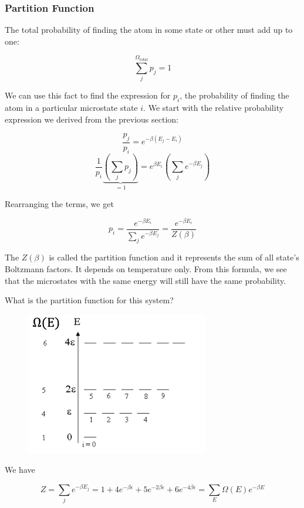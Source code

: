 \subsubsection{Partition Function}

The total probability of finding the atom in some state or other must add up to one:

$$\sum_j^{\Omega_{total}}p_j=1$$

We can use this fact to find the expression for $p_i$, the probability of finding the atom in a particular microstate state $i$. We start with the relative probability expression we derived from the previous section:

$$\frac{p_j}{p_i}=e^{-\beta(E_j-E_i)}$$
$$\frac{1}{p_i} \underbrace{\left( \sum_j p_j \right)}_{=1} = e^{\beta E_i}\left( \sum_j e^{-\beta E_j} \right)$$

Rearranging the terms, we get

$$\boxed{p_i=\frac{e^{-\beta E_i}}{\sum_j e^{-\beta E_j}}=\frac{e^{-\beta E_i}}{Z(\beta)}}$$

The $Z(\beta)$ is called the partition function and it represents the sum of all state's Boltzmann factors. It depends on temperature only. From this formula, we see that the microstates with the same energy will still have the same probability.

\begin{texample}
	What is the partition function for this system?
	
	\begin{figure}[H]
		\centering
		\includegraphics[width=80mm]{15.png}
	\end{figure}
	
	We have
	
	$$Z=\sum_j e^{-\beta E_j}=1+4e^{-\beta\epsilon}+5e^{-2\beta\epsilon}+6e^{-4\beta\epsilon}=\sum_E \Omega(E)e^{-\beta E}$$
\end{texample}

